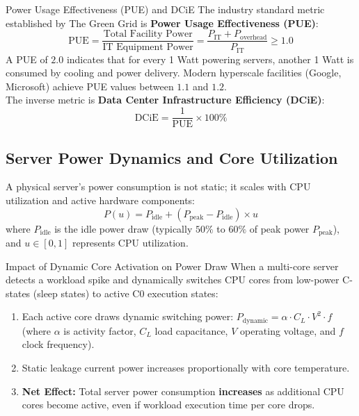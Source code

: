 \documentclass[11pt,a4paper,openany]{report}
\begin{document}
\begin{defbox}{Power Usage Effectiveness (PUE) and DCiE}
The industry standard metric established by The Green Grid is \textbf{Power Usage Effectiveness (PUE)}:
\begin{equation}
\text{PUE} = \frac{\text{Total Facility Power}}{\text{IT Equipment Power}} = \frac{P_{\text{IT}} + P_{\text{overhead}}}{P_{\text{IT}}} \ge 1.0
\end{equation}
A PUE of $2.0$ indicates that for every 1 Watt powering servers, another 1 Watt is consumed by cooling and power delivery. Modern hyperscale facilities (Google, Microsoft) achieve PUE values between $1.1$ and $1.2$.\\
The inverse metric is \textbf{Data Center Infrastructure Efficiency (DCiE)}:
\begin{equation}
\text{DCiE} = \frac{1}{\text{PUE}} \times 100\%
\end{equation}
\end{defbox}

\subsection{Server Power Dynamics and Core Utilization}
A physical server's power consumption is not static; it scales with CPU utilization and active hardware components:
\begin{equation}
P(u) = P_{\text{idle}} + (P_{\text{peak}} - P_{\text{idle}}) \times u
\end{equation}
where $P_{\text{idle}}$ is the idle power draw (typically $50\%$ to $60\%$ of peak power $P_{\text{peak}}$), and $u \in [0, 1]$ represents CPU utilization.

\begin{thmbox}{Impact of Dynamic Core Activation on Power Draw}
When a multi-core server detects a workload spike and dynamically switches CPU cores from low-power C-states (sleep states) to active C0 execution states:
\begin{enumerate}[leftmargin=*]
  \item Each active core draws dynamic switching power: $P_{\text{dynamic}} = \alpha \cdot C_L \cdot V^2 \cdot f$ (where $\alpha$ is activity factor, $C_L$ load capacitance, $V$ operating voltage, and $f$ clock frequency).
  \item Static leakage current power increases proportionally with core temperature.
  \item \textbf{Net Effect:} Total server power consumption \textbf{increases} as additional CPU cores become active, even if workload execution time per core drops.
\end{enumerate}
\end{thmbox}
\end{document}
